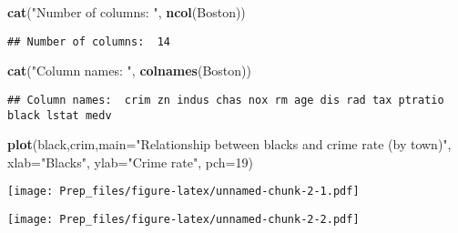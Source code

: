 \documentclass[]{article}
\newenvironment{Shaded}{\begin{snugshade}}{\end{snugshade}}
\newcommand{\DataTypeTok}[1]{\textcolor[rgb]{0.13,0.29,0.53}{#1}}
\newcommand{\DecValTok}[1]{\textcolor[rgb]{0.00,0.00,0.81}{#1}}
\newcommand{\KeywordTok}[1]{\textcolor[rgb]{0.13,0.29,0.53}{\textbf{#1}}}
\newcommand{\NormalTok}[1]{#1}
\newcommand{\StringTok}[1]{\textcolor[rgb]{0.31,0.60,0.02}{#1}}
\begin{document}
\begin{Shaded}
\begin{Highlighting}[]
\KeywordTok{cat}\NormalTok{(}\StringTok{"Number of columns: "}\NormalTok{, }\KeywordTok{ncol}\NormalTok{(Boston)) }
\end{Highlighting}
\end{Shaded}

\begin{verbatim}
## Number of columns:  14
\end{verbatim}

\begin{Shaded}
\begin{Highlighting}[]
\KeywordTok{cat}\NormalTok{(}\StringTok{"Column names: "}\NormalTok{, }\KeywordTok{colnames}\NormalTok{(Boston)) }
\end{Highlighting}
\end{Shaded}

\begin{verbatim}
## Column names:  crim zn indus chas nox rm age dis rad tax ptratio black lstat medv
\end{verbatim}

\begin{Shaded}
\begin{Highlighting}[]
\KeywordTok{plot}\NormalTok{(black,crim,}\DataTypeTok{main=}\StringTok{"Relationship between blacks and crime rate (by town)"}\NormalTok{, }\DataTypeTok{xlab=}\StringTok{"Blacks"}\NormalTok{, }\DataTypeTok{ylab=}\StringTok{"Crime rate"}\NormalTok{, }\DataTypeTok{pch=}\DecValTok{19}\NormalTok{)}
\end{Highlighting}
\end{Shaded}

\texttt{[image: Prep\_files/figure-latex/unnamed-chunk-2-1.pdf]}

\begin{Shaded}
\end{Shaded}

\texttt{[image: Prep\_files/figure-latex/unnamed-chunk-2-2.pdf]}

\begin{Shaded}
\end{Shaded}
\end{document}
